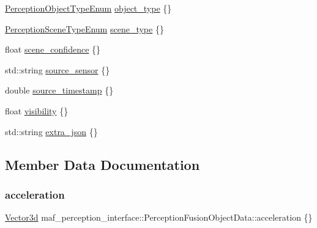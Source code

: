 \begin{DoxyCompactItemize}
\hyperlink{structmaf__perception__interface_1_1PerceptionObjectTypeEnum}{Perception\+Object\+Type\+Enum} \hyperlink{structmaf__perception__interface_1_1PerceptionFusionObjectData_ae493f50eb8819869dc36d341ec6ee977}{object\+\_\+type} \{\}
\item 
\hyperlink{structmaf__perception__interface_1_1PerceptionSceneTypeEnum}{Perception\+Scene\+Type\+Enum} \hyperlink{structmaf__perception__interface_1_1PerceptionFusionObjectData_ab8f7aa4dcf3d1949c3436a3cc6763e8a}{scene\+\_\+type} \{\}
\item 
float \hyperlink{structmaf__perception__interface_1_1PerceptionFusionObjectData_a5b185804a90a0110da5d16b574be5d39}{scene\+\_\+confidence} \{\}
\item 
std\+::string \hyperlink{structmaf__perception__interface_1_1PerceptionFusionObjectData_aaaa376210ccfaf70bdb36d1c89c8916c}{source\+\_\+sensor} \{\}
\item 
double \hyperlink{structmaf__perception__interface_1_1PerceptionFusionObjectData_ac1aece1cb75d2e5eef04f6b7dfea8027}{source\+\_\+timestamp} \{\}
\item 
float \hyperlink{structmaf__perception__interface_1_1PerceptionFusionObjectData_ab0bcd083940f87615d4663ad9224dee4}{visibility} \{\}
\item 
std\+::string \hyperlink{structmaf__perception__interface_1_1PerceptionFusionObjectData_afff173ea49305a170dbb493d2fb555dc}{extra\+\_\+json} \{\}
\end{DoxyCompactItemize}


\subsection{Member Data Documentation}
\mbox{\label{structmaf__perception__interface_1_1PerceptionFusionObjectData_a87b0856f76006c29c3bda15294dde594}} 
\subsubsection{\texorpdfstring{acceleration}{acceleration}}
{\footnotesize\ttfamily \hyperlink{structmaf__perception__interface_1_1Vector3d}{Vector3d} maf\+\_\+perception\+\_\+interface\+::\+Perception\+Fusion\+Object\+Data\+::acceleration \{\}}



